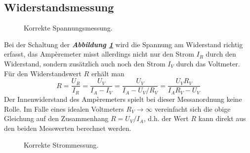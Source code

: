 \subsection{Widerstandsmessung}
\begin{figure}[H]
\centering
\caption{Korrekte Spannungsmessung.}
\label{fig_IIIt}
\end{figure}
\noindent Bei der Schaltung der \textbf{\textit{Abbildung \ref{fig_IIIt}}} wird die Spannung am Widerstand richtig erfasst, das Ampèremeter misst allerdings nicht nur den Strom $I_R$ durch den Widerstand, sondern zusätzlich auch noch den Strom $I_V$ durch das Voltmeter. Für den Widerstandswert $R$ erhält man 
\begin{equation}
\boxed{R=\dfrac{U_R}{I_R}=\dfrac{U_V}{I_A-I_V}=\dfrac{U_V}{I_A-U_V/R_V}=\dfrac{U_VR_V}{I_AR_V-U_V}}
\end{equation}
\noindent Der Innenwiderstand des Ampèremeters spielt bei dieser Messanordnung keine Rolle. Im Falle eines idealen Voltmeters $R_V\rightarrow \infty$ vereinfacht sich die obige Gleichung auf den Zusammenhang $R=U_V/I_A$, d.h. der Wert $R$ kann direkt aus den beiden Messwerten berechnet werden.
\begin{figure}[H]
\centering
\caption{Korrekte Strommessung.}
\label{fig_IIIu}
\end{figure}
